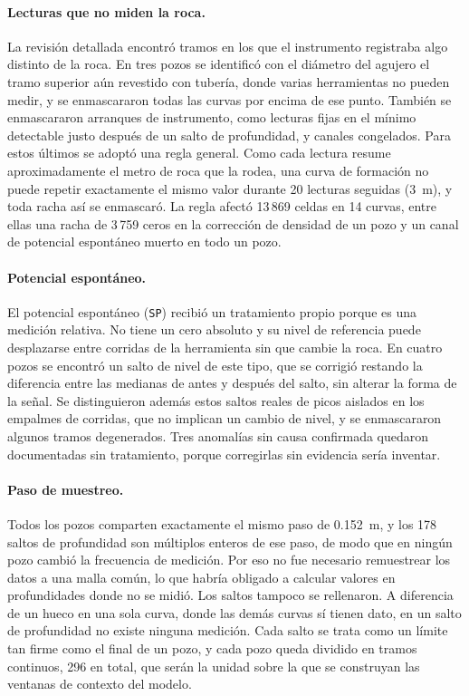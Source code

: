 \documentclass[11pt,a4paper]{article}
\begin{document}
\paragraph{Lecturas que no miden la roca.} La revisión detallada encontró tramos en los que el instrumento registraba algo distinto de la roca. En tres pozos se identificó con el diámetro del agujero el tramo superior aún revestido con tubería, donde varias herramientas no pueden medir, y se enmascararon todas las curvas por encima de ese punto. También se enmascararon arranques de instrumento, como lecturas fijas en el mínimo detectable justo después de un salto de profundidad, y canales congelados. Para estos últimos se adoptó una regla general. Como cada lectura resume aproximadamente el metro de roca que la rodea, una curva de formación no puede repetir exactamente el mismo valor durante 20 lecturas seguidas (3~m), y toda racha así se enmascaró. La regla afectó 13\,869 celdas en 14 curvas, entre ellas una racha de 3\,759 ceros en la corrección de densidad de un pozo y un canal de potencial espontáneo muerto en todo un pozo.

\paragraph{Potencial espontáneo.} El potencial espontáneo (\texttt{SP}) recibió un tratamiento propio porque es una medición relativa. No tiene un cero absoluto y su nivel de referencia puede desplazarse entre corridas de la herramienta sin que cambie la roca. En cuatro pozos se encontró un salto de nivel de este tipo, que se corrigió restando la diferencia entre las medianas de antes y después del salto, sin alterar la forma de la señal. Se distinguieron además estos saltos reales de picos aislados en los empalmes de corridas, que no implican un cambio de nivel, y se enmascararon algunos tramos degenerados. Tres anomalías sin causa confirmada quedaron documentadas sin tratamiento, porque corregirlas sin evidencia sería inventar.

\paragraph{Paso de muestreo.} Todos los pozos comparten exactamente el mismo paso de 0.152~m, y los 178 saltos de profundidad son múltiplos enteros de ese paso, de modo que en ningún pozo cambió la frecuencia de medición. Por eso no fue necesario remuestrear los datos a una malla común, lo que habría obligado a calcular valores en profundidades donde no se midió. Los saltos tampoco se rellenaron. A diferencia de un hueco en una sola curva, donde las demás curvas sí tienen dato, en un salto de profundidad no existe ninguna medición. Cada salto se trata como un límite tan firme como el final de un pozo, y cada pozo queda dividido en tramos continuos, 296 en total, que serán la unidad sobre la que se construyan las ventanas de contexto del modelo.
\end{document}
